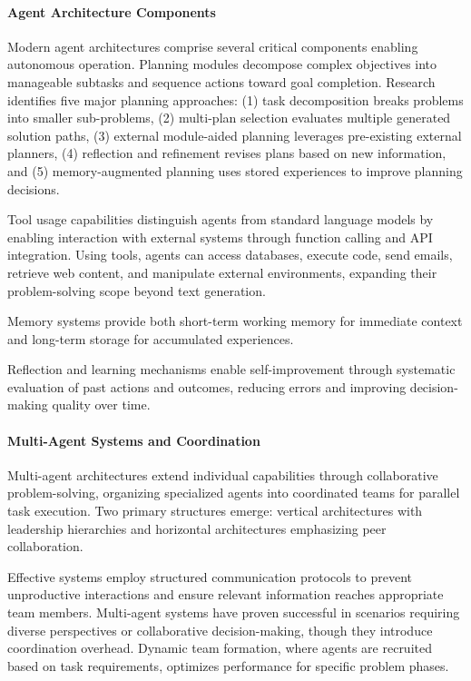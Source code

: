 \paragraph{Agent Architecture Components}
Modern agent architectures comprise several critical components enabling autonomous operation.
Planning modules decompose complex objectives into manageable subtasks and sequence actions toward goal completion.
Research identifies five major planning approaches: (1) task decomposition breaks problems into smaller sub-problems, (2) multi-plan selection evaluates multiple generated solution paths, (3) external module-aided planning leverages pre-existing external planners, (4) reflection and refinement revises plans based on new information, and (5) memory-augmented planning uses stored experiences to improve planning decisions.

Tool usage capabilities distinguish agents from standard language models by enabling interaction with external systems through function calling and API integration.
Using tools, agents can access databases, execute code, send emails, retrieve web content, and manipulate external environments, expanding their problem-solving scope beyond text generation.

Memory systems provide both short-term working memory for immediate context and long-term storage for accumulated experiences.

Reflection and learning mechanisms enable self-improvement through systematic evaluation of past actions and outcomes, reducing errors and improving decision-making quality over time.

\paragraph{Multi-Agent Systems and Coordination}
Multi-agent architectures extend individual capabilities through collaborative problem-solving, organizing specialized agents into coordinated teams for parallel task execution.
Two primary structures emerge: vertical architectures with leadership hierarchies and horizontal architectures emphasizing peer collaboration.

Effective systems employ structured communication protocols to prevent unproductive interactions and ensure relevant information reaches appropriate team members.
Multi-agent systems have proven successful in scenarios requiring diverse perspectives or collaborative decision-making, though they introduce coordination overhead.
Dynamic team formation, where agents are recruited based on task requirements, optimizes performance for specific problem phases.

